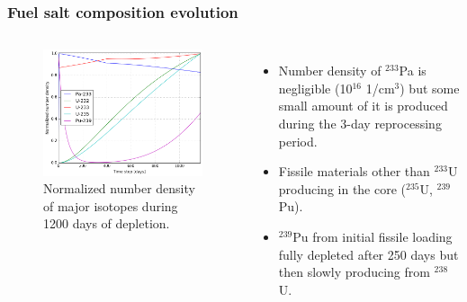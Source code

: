 \begin{frame}
  \frametitle{Fuel salt composition evolution}
    \begin{columns}
    \column[t]{7cm}
   \vspace{-0.35in}
  \begin{figure}[t]
   \hspace*{-0.15in}
   \includegraphics[height=0.75\textheight]{./images/fuel_composition.png}
   \vspace{-0.05in}
   \caption{Normalized number density of major isotopes during 1200 days of depletion.}
    \end{figure}

    \column[t]{5cm}
       \begin{itemize}
        \item Number density of $^{233}$Pa is negligible (10$^{16}$ 1/cm$^3$) but some small amount of it is produced
during the 3-day reprocessing period. 
   		\item Fissile materials other than $^{233}$U producing in the core ($^{235}$U, $^{239}$Pu).
   		\item $^{239}$Pu from initial fissile loading fully depleted after 250 days but then slowly producing from $^{238}$U.
       \end{itemize}
     \end{columns}
\end{frame}

